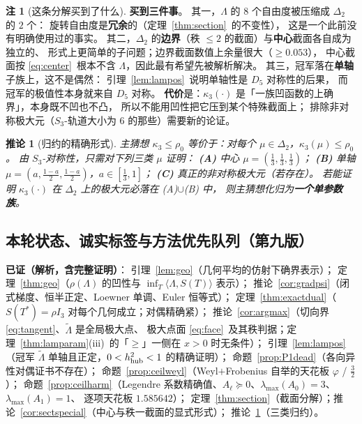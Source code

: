 \documentclass[UTF8,11pt]{ctexart}
\newtheorem{corollary}[theorem]{推论}
\theoremstyle{definition}
\newtheorem{remark}[theorem]{注}
\newcommand{\Lam}{\Lambda}
\begin{document}
\begin{remark}[这条分解买到了什么]\label{rmk:sectread}
\textbf{买到三件事}。
其一，$\Lam$ 的 $8$ 个自由度被压缩成 $\Delta_2$ 的 $2$ 个：
旋转自由度是\textbf{冗余}的（定理~\ref{thm:section}~的不变性），
这是一个此前没有明确使用过的事实。
其二，$\Delta_2$ 的\textbf{边界}（秩 $\le2$ 的截面）与\textbf{中心}截面各自成为独立的、
形式上更简单的子问题；边界截面数值上余量很大（$\ge0.053$），
中心截面按 \eqref{eq:center}~根本不含 $\Lam$，因此最有希望先被解析解决。
其三，冠军落在\textbf{单轴}子族上，这不是偶然：
引理~\ref{lem:lampos}~说明单轴性是 $D_5$ 对称性的后果，
而冠军的极值性本身就来自 $D_5$ 对称。
\textbf{代价}是：$\kappa_3(\cdot)$ 是「一族凹函数的上确界」，本身既不凹也不凸，
所以不能用凹性把它压到某个特殊截面上；
排除非对称极大元（$S_3$-轨道大小为 $6$ 的那些）需要新的论证。
\end{remark}

\begin{corollary}[归约的精确形式]\label{cor:sectreduce}
主猜想 $\kappa_3\le\rho_0$ 等价于：对每个 $\mu\in\Delta_2$，$\kappa_3(\mu)\le\rho_0$。
由 $S_3$-对称性，只需对下列三类 $\mu$ 证明：
\textbf{(A)} 中心 $\mu=(\frac13,\frac13,\frac13)$；
\textbf{(B)} 单轴 $\mu=(a,\frac{1-a}2,\frac{1-a}2)$，$a\in[\frac13,1]$；
\textbf{(C)} 真正的非对称极大元（若存在）。
若能证明 $\kappa_3(\cdot)$ 在 $\Delta_2$ 上的极大元必落在 (A)$\cup$(B) 中，
则主猜想化归为\textbf{一个单参数族}。
\end{corollary}

\subsection{本轮状态、诚实标签与方法优先队列（第九版）}\label{sec:r19:status}

\textbf{已证（解析，含完整证明）}：
引理~\ref{lem:geo}（几何平均的仿射下确界表示）；
定理~\ref{thm:geo}（$\rho(\Lam)$ 的凹性与 $\inf_T\langle\Lam,S(T)\rangle$ 表示）；
推论~\ref{cor:gradpsi}（闭式梯度、恒半正定、Loewner 单调、Euler 恒等式）；
定理~\ref{thm:exactdual}（$S(T^*)=\rho I_3$ 对每个几何成立；对偶精确紧）；
推论~\ref{cor:argmax}（切向界 \eqref{eq:tangent}、$\tilde\Lam$ 是全局极大点、
极大点面 \eqref{eq:face}~及其秩判据；定理~\ref{thm:lamparam}(iii)~的「$\ge$」一侧在 $x>0$ 时无条件）；
引理~\ref{lem:lampos}（冠军 $\tilde\Lam$ 单轴且正定，$0<h_{\rm hub}^2<1$ 的精确证明）；
命题~\ref{prop:P1dead}（各向异性对偶证书不存在）；
命题~\ref{prop:ceilweyl}（Weyl$+$Frobenius 自举的天花板 $\varphi$ / $\frac32$）；
命题~\ref{prop:ceilharm}（Legendre 系数精确值、$A_\ell\succeq0$、$\lambda_{\max}(A_0)=3$、$\lambda_{\max}(A_1)=1$、
逐项天花板 $1.585642$）；
定理~\ref{thm:section}（截面分解）；推论~\ref{cor:sectspecial}（中心与秩一截面的显式形式）；
推论~\ref{cor:sectreduce}（三类归约）。
\end{document}
